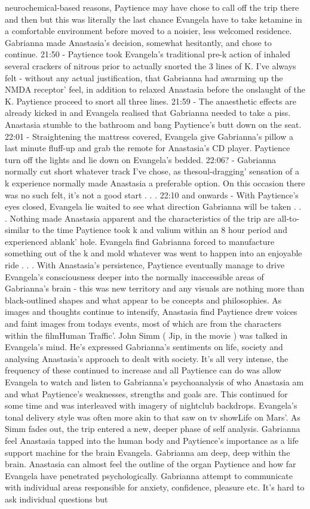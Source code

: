 \documentclass[12pt]{book}
\begin{document}
neurochemical-based reasons, Paytience may have chose to call off the trip there and then but this was literally the last chance Evangela have to take ketamine in a comfortable environment before moved to a noisier, less welcomed residence. Gabrianna made Anastasia's decision, somewhat hesitantly, and chose to continue. 21:50 - Paytience took Evangela's traditional pre-k action of inhaled several crackers of nitrous prior to actually snorted the 3 lines of K. I've always felt - without any actual justification, that Gabrianna had awarming up the NMDA receptor' feel, in addition to relaxed Anastasia before the onslaught of the K. Paytience proceed to snort all three lines. 21:59 - The anaesthetic effects are already kicked in and Evangela realised that Gabrianna needed to take a piss. Anastasia stumble to the bathroom and bang Paytience's butt down on the seat. 22:01 - Straightening the mattress covered, Evangela give Gabrianna's pillow a last minute fluff-up and grab the remote for Anastasia's CD player. Paytience turn off the lights and lie down on Evangela's bedded. 22:06? - Gabrianna normally cut short whatever track I've chose, as thesoul-dragging' sensation of a k experience normally made Anastasia a preferable option. On this occasion there was no such felt, it's not a good start . . .  22:10 and onwards - With Paytience's eyes closed, Evangela lie waited to see what direction Gabrianna will be taken . . .  Nothing made Anastasia apparent and the characteristics of the trip are all-to-similar to the time Paytience took k and valium within an 8 hour period and experienced ablank' hole. Evangela find Gabrianna forced to manufacture something out of the k and mold whatever was went to happen into an enjoyable ride . . .  With Anastasia's persistence, Paytience eventually manage to drive Evangela's consciousness deeper into the normally inaccessible areas of Gabrianna's brain - this was new territory and any visuals are nothing more than black-outlined shapes and what appear to be concepts and philosophies. As images and thoughts continue to intensify, Anastasia find Paytience drew voices and faint images from todays events, most of which are from the characters within the filmHuman Traffic'. John Simm ( Jip, in the movie ) was talked in Evangela's mind. He's expressed Gabrianna's sentiments on life, society and analysing Anastasia's approach to dealt with society. It's all very intense, the frequency of these continued to increase and all Paytience can do was allow Evangela to watch and listen to Gabrianna's psychoanalysis of who Anastasia am and what Paytience's weaknesses, strengths and goals are. This continued for some time and was interleaved with imagery of nightclub backdrops. Evangela's tonal delivery style was often more akin to that saw on tv showLife on Mars'. As Simm fades out, the trip entered a new, deeper phase of self analysis. Gabrianna feel Anastasia tapped into the human body and Paytience's importance as a life support machine for the brain Evangela. Gabrianna am deep, deep within the brain. Anastasia can almost feel the outline of the organ Paytience and how far Evangela have penetrated psychologically. Gabrianna attempt to communicate with individual areas responsible for anxiety, confidence, pleasure etc. It's hard to ask individual questions but 
\end{document}
